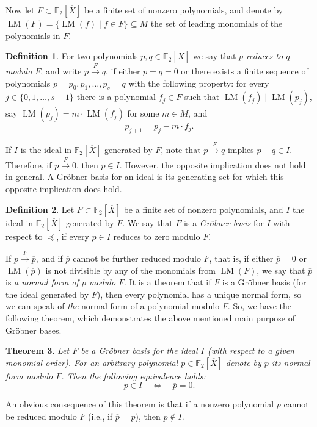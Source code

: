 \documentclass{amsart}
\newtheorem{theorem}{Theorem}[section]
\theoremstyle{definition}
\newtheorem{definition}[theorem]{Definition}
\theoremstyle{remark}
\numberwithin{equation}{section}
\newcommand{\F}{\mathbb F}
\newcommand{\lm}{\operatorname{LM}}
\begin{document}
Now let $F\subset\F_2[\overline X]$ be a finite set of nonzero polynomials, and denote by $\lm(F)=\{\lm(f)\mid f\in F\}\subseteq M$ the set of leading monomials of the polynomials in $F$. 
\begin{definition}
    For two polynomials $p,q\in\F_2[\overline X]$ we say that $p$ {\it reduces to $q$ modulo $F$}, and write $p\stackrel{F}\longrightarrow q$, if either $p=q=0$ or there exists a finite sequence of polynomials $p=p_0,p_1,\ldots,p_s=q$ with the following property: for every $j\in\{0,1,\ldots,s-1\}$ there is a polynomial $f_j\in F$ such that $\lm(f_j)\mid\lm(p_j)$, say $\lm(p_j)=m\cdot\lm(f_j)$ for some $m\in M$, and 
    \[p_{j+1}=p_j-m\cdot f_j.\]
\end{definition}
If $I$ is the ideal in $\F_2[\overline X]$ generated by $F$, note that $p\stackrel{F}\longrightarrow q$ implies $p-q\in I$. Therefore, if $p\stackrel{F}\longrightarrow0$, then $p\in I$. However, the opposite implication does not hold in general. A Gr\"obner basis for an ideal is its generating set for which this opposite implication does hold.
\begin{definition}
   Let $F\subset\F_2[\overline X]$ be a finite set of nonzero polynomials, and $I$ the ideal in $\F_2[\overline X]$ generated by $F$. We say that $F$ is a {\it Gr\"obner basis} for $I$ with respect to $\preceq$, if every $p\in I$ reduces to zero modulo $F$. 
\end{definition}
If $p\stackrel{F}\longrightarrow\overline p$, and if $\overline p$ cannot be further reduced modulo $F$, that is, if either $\overline p=0$ or $\lm(\overline p)$ is not divisible by any of the monomials from $\lm(F)$, we say that $\overline p$ is {\it a normal form of $p$ modulo $F$}. It is a theorem that if $F$ is a Gr\"obner basis (for the ideal generated by $F$), then every polynomial has a unique normal form, so we can speak of {\it the} normal form of a polynomial modulo $F$. So, we have the following theorem, which demonstrates the above mentioned main purpose of Gr\"obner bases.
\begin{theorem}\label{normalform}
    Let $F$ be a Gr\"obner basis for the ideal $I$ (with respect to a given monomial order). For an arbitrary polynomial $p\in\F_2[\overline X]$ denote by $\overline p$ its normal form modulo $F$. Then the following equivalence holds:
    \[p\in I \quad \Longleftrightarrow \quad \overline p=0.\]
\end{theorem}

An obvious consequence of this theorem is that if a nonzero polynomial $p$ cannot be reduced modulo $F$ (i.e., if $\overline p=p$), then $p\notin I$.
\end{document}
